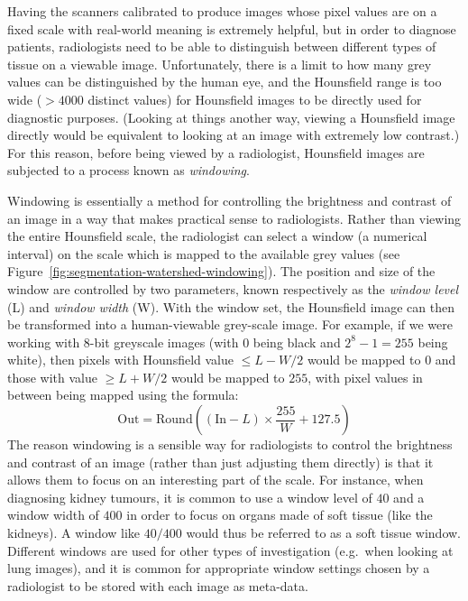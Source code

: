 Having the scanners calibrated to produce images whose pixel values are on a fixed scale with real-world meaning is extremely helpful, but in order to diagnose patients, radiologists need to be able to distinguish between different types of tissue on a viewable image. Unfortunately, there is a limit to how many grey values can be distinguished by the human eye, and the Hounsfield range is too wide ($> 4000$ distinct values) for Hounsfield images to be directly used for diagnostic purposes. (Looking at things another way, viewing a Hounsfield image directly would be equivalent to looking at an image with extremely low contrast.) For this reason, before being viewed by a radiologist, Hounsfield images are subjected to a process known as \emph{windowing}.

Windowing is essentially a method for controlling the brightness and contrast of an image in a way that makes practical sense to radiologists. Rather than viewing the entire Hounsfield scale, the radiologist can select a window (a numerical interval) on the scale which is mapped to the available grey values (see Figure~\ref{fig:segmentation-watershed-windowing}). The position and size of the window are controlled by two parameters, known respectively as the \emph{window level} (L) and \emph{window width} (W). With the window set, the Hounsfield image can then be transformed into a human-viewable grey-scale image. For example, if we were working with 8-bit greyscale images (with $0$ being black and $2^8 - 1 = 255$ being white), then pixels with Hounsfield value $\le L - W/2$ would be mapped to $0$ and those with value $\ge L + W/2$ would be mapped to $255$, with pixel values in between being mapped using the formula:
%
\[
\mbox{Out} = \mbox{Round}\left( (\mbox{In} - L) \times \frac{255}{W} + 127.5 \right)
\]
%
The reason windowing is a sensible way for radiologists to control the brightness and contrast of an image (rather than just adjusting them directly) is that it allows them to focus on an interesting part of the scale. For instance, when diagnosing kidney tumours, it is common to use a window level of $40$ and a window width of $400$ in order to focus on organs made of soft tissue (like the kidneys). A window like $40/400$ would thus be referred to as a soft tissue window. Different windows are used for other types of investigation (e.g.~when looking at lung images), and it is common for appropriate window settings chosen by a radiologist to be stored with each image as meta-data.

